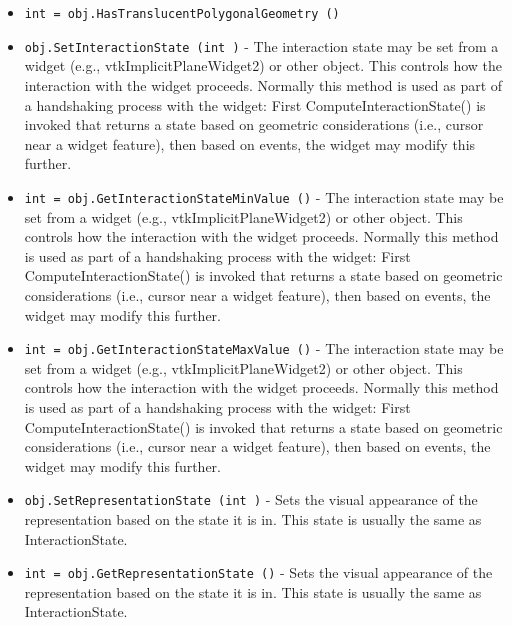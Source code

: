 \begin{itemize}
\item  \verb|int = obj.HasTranslucentPolygonalGeometry ()|

\item  \verb|obj.SetInteractionState (int )| -  The interaction state may be set from a widget (e.g.,
 vtkImplicitPlaneWidget2) or other object. This controls how the
 interaction with the widget proceeds. Normally this method is used as
 part of a handshaking process with the widget: First
 ComputeInteractionState() is invoked that returns a state based on
 geometric considerations (i.e., cursor near a widget feature), then
 based on events, the widget may modify this further.

\item  \verb|int = obj.GetInteractionStateMinValue ()| -  The interaction state may be set from a widget (e.g.,
 vtkImplicitPlaneWidget2) or other object. This controls how the
 interaction with the widget proceeds. Normally this method is used as
 part of a handshaking process with the widget: First
 ComputeInteractionState() is invoked that returns a state based on
 geometric considerations (i.e., cursor near a widget feature), then
 based on events, the widget may modify this further.

\item  \verb|int = obj.GetInteractionStateMaxValue ()| -  The interaction state may be set from a widget (e.g.,
 vtkImplicitPlaneWidget2) or other object. This controls how the
 interaction with the widget proceeds. Normally this method is used as
 part of a handshaking process with the widget: First
 ComputeInteractionState() is invoked that returns a state based on
 geometric considerations (i.e., cursor near a widget feature), then
 based on events, the widget may modify this further.

\item  \verb|obj.SetRepresentationState (int )| -  Sets the visual appearance of the representation based on the
 state it is in. This state is usually the same as InteractionState.

\item  \verb|int = obj.GetRepresentationState ()| -  Sets the visual appearance of the representation based on the
 state it is in. This state is usually the same as InteractionState.

\end{itemize}
